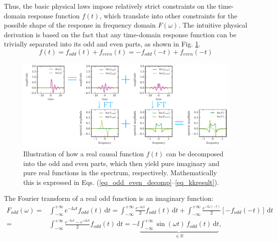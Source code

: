 Thus, the basic physical laws impose relatively strict constraints on the time-domain response function $f(t)$, which translate into other constraints for the possible shape of the response in frequency domain $F(\omega)$. The intuitive physical derivation is based on the fact that any time-domain response function can be trivially separated into its odd and even parts, as shown in Fig. \ref{fg_kk}. 
\begin{equation}f(t) = f_{odd}(t) + f_{even}(t) = -f_{odd}(-t) + f_{even}(-t) \label{eq_odd_even_decomp}\end{equation}
\begin{figure}[t] \caption{Illustration of how a real causal function $f(t)$ can be decomposed into the odd and even parts, which then yield pure imaginary and pure real functions in the spectrum, respectively. Mathematically this is expressed in Eqs. (\ref{eq_odd_even_decomp}--\ref{eq_kkresult}).} \label{fg_kk} \centering 
	\includegraphics[width=\textwidth]{img/Kramers_Kronig_plot/kk.pdf}
\end{figure}
The Fourier transform of a real odd function is an imaginary function:
\begin{equation} 
\begin{split} 
F_{odd}(\omega)=& \int_{-\infty}^{+\infty} e^{-\ii \omega t} f_{odd}(t) \,\mbox{d}t = 
		 \int_{-\infty}^{+\infty} \frac{e^{-\ii \omega   t }}{2} f_{odd}(t) \,\mbox{d}t 
		   +  \int_{-\infty}^{+\infty} \frac{e^{-\ii \omega (-t)}}{2} [-f_{odd}(-t)] \,\mbox{d}t  \\
		 =&   \int_{-\infty}^{+\infty} \frac{e^{-\ii \omega t}-e^{+\ii \omega t}}{2} f_{odd}(t) \,\mbox{d}t 
		 = -\ii \underbrace{\int_{-\infty}^{+\infty} \sin(\omega t) \, f_{odd}(t) \,\mbox{d}t}_{\mbox{$\in \mathbb{R}$}},
\end{split} 
\label{eq_kkF}\end{equation}
